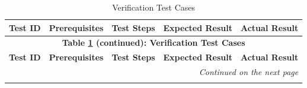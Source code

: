 \documentclass[]{final_report}
\theoremstyle{definition}
\begin{document}
\begin{longtable}{|p{1.2cm}|p{3cm}|p{3cm}|p{4cm}|p{4cm}|}
  \caption{Verification Test Cases} \label{tab:verification_test_cases} \\
  \hline
  \textbf{Test ID} & \textbf{Prerequisites} & \textbf{Test Steps} & \textbf{Expected Result} & \textbf{Actual Result} \\
  \hline
  \endfirsthead

  \multicolumn{5}{c}{\textbf{Table \ref{tab:verification_test_cases} (continued): Verification Test Cases}} \\
  \hline
  \textbf{Test ID} & \textbf{Prerequisites} & \textbf{Test Steps} & \textbf{Expected Result} & \textbf{Actual Result} \\
  \hline
  \endhead

  \hline
  \multicolumn{5}{r}{\textit{Continued on the next page}} \\
  \endfoot

  \hline
  \endlastfoot


\end{longtable}
\end{document}
